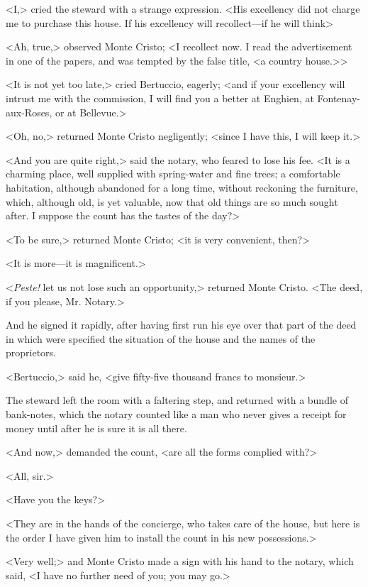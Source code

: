  <I,> cried the steward with a strange expression. <His excellency did not charge me to purchase this house. If his excellency will recollect—if he will think\longdash> 

 <Ah, true,> observed Monte Cristo; <I recollect now. I read the advertisement in one of the papers, and was tempted by the false title, <a country house.>> 

 <It is not yet too late,> cried Bertuccio, eagerly; <and if your excellency will intrust me with the commission, I will find you a better at Enghien, at Fontenay-aux-Roses, or at Bellevue.> 

 <Oh, no,> returned Monte Cristo negligently; <since I have this, I will keep it.> 

 <And you are quite right,> said the notary, who feared to lose his fee. <It is a charming place, well supplied with spring-water and fine trees; a comfortable habitation, although abandoned for a long time, without reckoning the furniture, which, although old, is yet valuable, now that old things are so much sought after. I suppose the count has the tastes of the day?> 

 <To be sure,> returned Monte Cristo; <it is very convenient, then?> 

 <It is more—it is magnificent.> 

 <\textit{Peste!} let us not lose such an opportunity,> returned Monte Cristo. <The deed, if you please, Mr. Notary.> 

 And he signed it rapidly, after having first run his eye over that part of the deed in which were specified the situation of the house and the names of the proprietors. 

 <Bertuccio,> said he, <give fifty-five thousand francs to monsieur.> 

 The steward left the room with a faltering step, and returned with a bundle of bank-notes, which the notary counted like a man who never gives a receipt for money until after he is sure it is all there. 

 <And now,> demanded the count, <are all the forms complied with?> 

 <All, sir.> 

 <Have you the keys?> 

 <They are in the hands of the concierge, who takes care of the house, but here is the order I have given him to install the count in his new possessions.> 

 <Very well;> and Monte Cristo made a sign with his hand to the notary, which said, <I have no further need of you; you may go.> 


